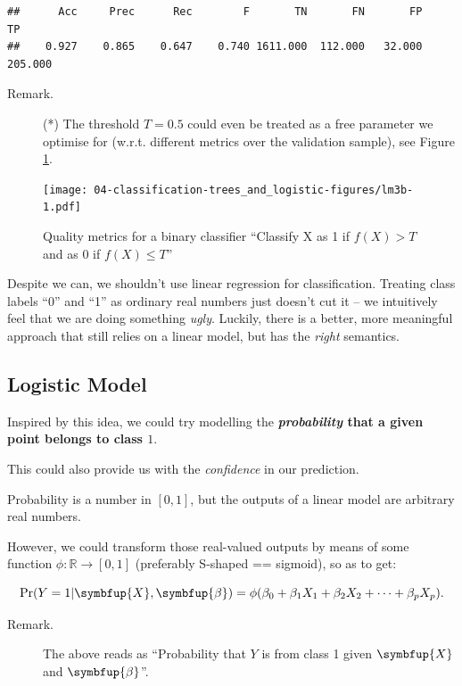 \documentclass[10pt,b5paper,krantz1]{krantz}
\renewcommand{\mathbf}[1]{\symbfup{#1}}
\renewcommand{\boldsymbol}[1]{\symbfup{#1}}
\begin{document}
\begin{verbatim}
##      Acc     Prec      Rec        F       TN       FN       FP       TP 
##    0.927    0.865    0.647    0.740 1611.000  112.000   32.000  205.000
\end{verbatim}

\begin{description}
\item[Remark.]
(*) The threshold \(T=0.5\) could even be treated as a free parameter
we optimise for (w.r.t. different metrics over the validation sample),
see Figure \ref{fig:lm3b}.
\end{description}

\begin{figure}
\hypertarget{fig:lm3b}{%
\centering
\texttt{[image: 04-classification-trees\_and\_logistic-figures/lm3b-1.pdf]}
\caption{Quality metrics for a binary classifier ``Classify X as 1 if \(f(X)>T\) and as 0 if \(f(X)\le T\)''}\label{fig:lm3b}
}
\end{figure}

Despite we can, we shouldn't use linear regression for classification.
Treating class labels ``0'' and ``1'' as ordinary real numbers just doesn't
cut it -- we intuitively feel that we are doing something \emph{ugly}.
Luckily, there is a better, more meaningful approach that
still relies on a linear model, but has the \emph{right} semantics.

\hypertarget{logistic-model}{%
\subsection{Logistic Model}\label{logistic-model}}

Inspired by this idea, we could try modelling
the \textbf{\emph{probability} that a given point belongs to class \(1\)}.

This could also provide us with the \emph{confidence} in our prediction.

Probability is a number in \([0,1]\), but the outputs of a linear model are arbitrary real numbers.

However, we could transform those real-valued outputs by means
of some function \(\phi:\mathbb{R}\to[0,1]\) (preferably S-shaped == sigmoid),
so as to get:

\[
\Pr(Y=1|\mathbf{X},\boldsymbol\beta)=\phi(\beta_0 + \beta_1 X_1 + \beta_2 X_2 + \dots + \beta_p X_p).
\]

\begin{description}
\item[Remark.]
The above reads as ``Probability that \(Y\) is from class 1 given \(\mathbf{X}\)
and \(\boldsymbol\beta\)''.
\end{description}
\end{document}
